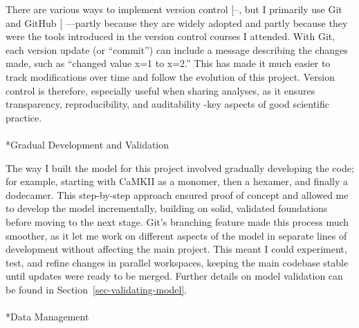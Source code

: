 \documentclass[
  11pt,
  letterpaper,
]{scrreprt}
\makeatletter
\let\oldparagraph\paragraph
\renewcommand{\paragraph}{
    \@ifstar
      \xxxParagraphStar
      \xxxParagraphNoStar
  }
\newcommand{\xxxParagraphStar}[1]{\oldparagraph*{#1}\mbox{}}
\newcommand{\xxxParagraphNoStar}[1]{\oldparagraph{#1}\mbox{}}
\makeatother
\begin{document}
There are various ways to implement version control
{[}--\citeproc{ref-hethey2013GitLab}{396}{]},
but I primarily use Git and GitHub
{[}\citeproc{ref-loeliger2012Version}{397}{]} ---partly because they are
widely adopted and partly because they were the tools introduced in the
version control courses I attended. With Git, each version update (or
``commit'') can include a message describing the changes made, such as
``changed value x=1 to x=2.'' This has made it much easier to track
modifications over time and follow the evolution of this project.
Version control is therefore, especially useful when sharing analyses,
as it ensures transparency, reproducibility, and auditability -key
aspects of good scientific practice.

\paragraph*{Gradual Development and
Validation}\label{gradual-development-and-validation}

The way I built the model for this project involved gradually developing
the code; for example, starting with CaMKII as a monomer, then a
hexamer, and finally a dodecamer. This step-by-step approach ensured
proof of concept and allowed me to develop the model incrementally,
building on solid, validated foundations before moving to the next
stage. Git's branching feature made this process much smoother, as it
let me work on different aspects of the model in separate lines of
development without affecting the main project. This meant I could
experiment, test, and refine changes in parallel workspaces, keeping the
main codebase stable until updates were ready to be merged. Further
details on model validation can be found in
Section~\ref{sec-validating-model}.

\paragraph*{Data Management}\label{data-management}
\end{document}
